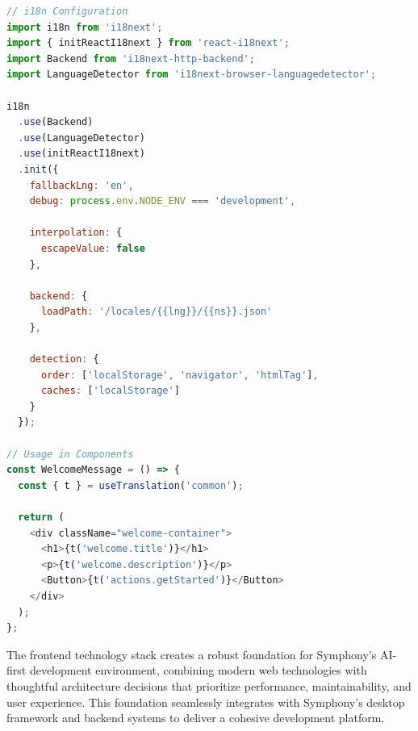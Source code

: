 \begin{lstlisting}[language=JavaScript, caption=Internationalization Configuration]
// i18n Configuration
import i18n from 'i18next';
import { initReactI18next } from 'react-i18next';
import Backend from 'i18next-http-backend';
import LanguageDetector from 'i18next-browser-languagedetector';

i18n
  .use(Backend)
  .use(LanguageDetector)
  .use(initReactI18next)
  .init({
    fallbackLng: 'en',
    debug: process.env.NODE_ENV === 'development',
    
    interpolation: {
      escapeValue: false
    },
    
    backend: {
      loadPath: '/locales/{{lng}}/{{ns}}.json'
    },
    
    detection: {
      order: ['localStorage', 'navigator', 'htmlTag'],
      caches: ['localStorage']
    }
  });

// Usage in Components
const WelcomeMessage = () => {
  const { t } = useTranslation('common');
  
  return (
    <div className="welcome-container">
      <h1>{t('welcome.title')}</h1>
      <p>{t('welcome.description')}</p>
      <Button>{t('actions.getStarted')}</Button>
    </div>
  );
};
\end{lstlisting}

The frontend technology stack creates a robust foundation for Symphony's AI-first development environment, combining modern web technologies with thoughtful architecture decisions that prioritize performance, maintainability, and user experience. This foundation seamlessly integrates with Symphony's desktop framework and backend systems to deliver a cohesive development platform.